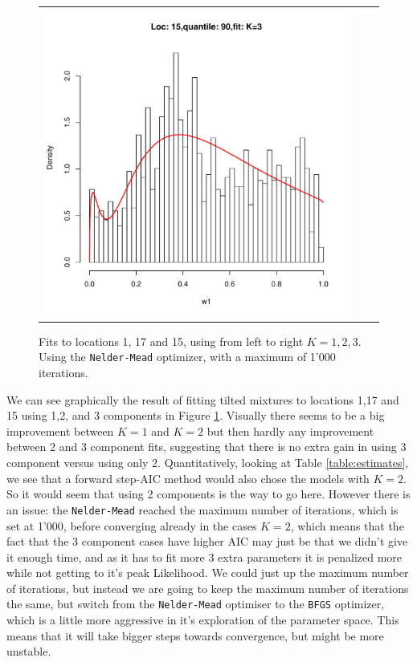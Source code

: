 \begin{figure}[h]
\begin{tabular}{ccc}
\includegraphics[width=\textwidth/3]{../img/loc15/quantile90/fit_K3.pdf}\\
\end{tabular}
\caption{Fits to locations 1, 17 and 15, using from left to right $K=1,2,3$. Using the \texttt{Nelder-Mead} optimizer, with a maximum of 1'000 iterations.}
\label{fig:data_fit}
\end{figure}


We can see graphically the result of fitting tilted mixtures to locations 1,17 and 15 using 1,2, and 3 components in Figure \ref{fig:data_fit}. Visually there seems to be a big improvement between $K=1$ and $K=2$ but then hardly any improvement between 2 and 3 component fits, suggesting that there is no extra gain in using 3 component versus using only 2. Quantitatively, looking at Table \ref{table:estimates}, we see that a forward step-AIC method would also chose the models with $K=2$. So it would seem that using 2 components is the way to go here. However there is an issue: the \texttt{Nelder-Mead} reached the maximum number of iterations, which is set at 1'000, before converging already in the cases $K=2$, which means that the fact that the 3 component cases have higher AIC may just be that we didn't give it enough time, and as it has to fit more 3 extra parameters it is penalized more while not getting to it's peak Likelihood.
We could just up the maximum number of iterations, but instead we are going to keep the maximum number of iterations the same, but switch from the \texttt{Nelder-Mead} optimiser to the \texttt{BFGS} optimizer, which is a little more aggressive in it's exploration of the parameter space. This means that it will take bigger steps towards convergence, but might be more unstable.


